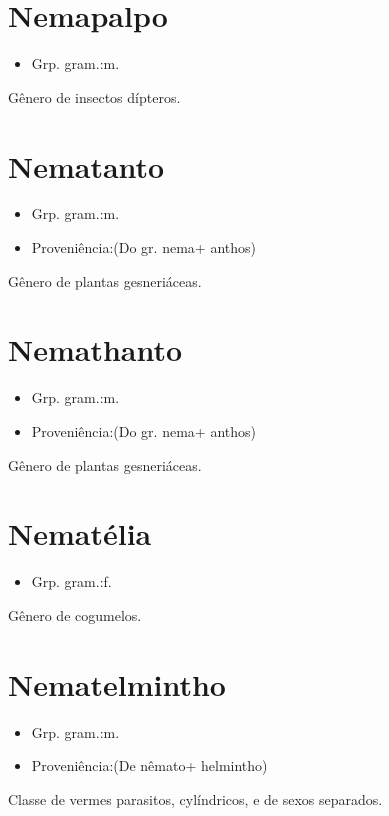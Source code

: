 \section{Nemapalpo}
\begin{itemize}
\item {Grp. gram.:m.}
\end{itemize}
Gênero de insectos dípteros.
\section{Nematanto}
\begin{itemize}
\item {Grp. gram.:m.}
\end{itemize}
\begin{itemize}
\item {Proveniência:(Do gr. \textunderscore nema\textunderscore  + \textunderscore anthos\textunderscore )}
\end{itemize}
Gênero de plantas gesneriáceas.
\section{Nemathanto}
\begin{itemize}
\item {Grp. gram.:m.}
\end{itemize}
\begin{itemize}
\item {Proveniência:(Do gr. \textunderscore nema\textunderscore  + \textunderscore anthos\textunderscore )}
\end{itemize}
Gênero de plantas gesneriáceas.
\section{Nematélia}
\begin{itemize}
\item {Grp. gram.:f.}
\end{itemize}
Gênero de cogumelos.
\section{Nematelmintho}
\begin{itemize}
\item {Grp. gram.:m.}
\end{itemize}
\begin{itemize}
\item {Proveniência:(De \textunderscore nêmato\textunderscore  + \textunderscore helmintho\textunderscore )}
\end{itemize}
Classe de vermes parasitos, cylíndricos, e de sexos separados.
